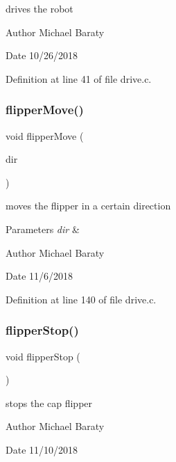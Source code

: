 drives the robot 

\begin{DoxyAuthor}{Author}
Michael Baraty 
\end{DoxyAuthor}
\begin{DoxyDate}{Date}
10/26/2018 
\end{DoxyDate}


Definition at line 41 of file drive.\+c.

\mbox{\label{drive_8c_a8fb87ee769c5cb856ac57381622779b0}} 
\subsubsection{flipper\+Move()}
{\footnotesize\ttfamily void flipper\+Move (\begin{DoxyParamCaption}\item[{\textbf{ Flipper\+Direction}}]{dir }\end{DoxyParamCaption})}



moves the flipper in a certain direction 


\begin{DoxyParams}{Parameters}
{\em dir} & \\
\hline
\end{DoxyParams}
\begin{DoxyAuthor}{Author}
Michael Baraty 
\end{DoxyAuthor}
\begin{DoxyDate}{Date}
11/6/2018 
\end{DoxyDate}


Definition at line 140 of file drive.\+c.

\mbox{\label{drive_8c_ad2b33937a785dc4201bcae5b6ed66b9f}} 
\subsubsection{flipper\+Stop()}
{\footnotesize\ttfamily void flipper\+Stop (\begin{DoxyParamCaption}{ }\end{DoxyParamCaption})}



stops the cap flipper 

\begin{DoxyAuthor}{Author}
Michael Baraty 
\end{DoxyAuthor}
\begin{DoxyDate}{Date}
11/10/2018 
\end{DoxyDate}


